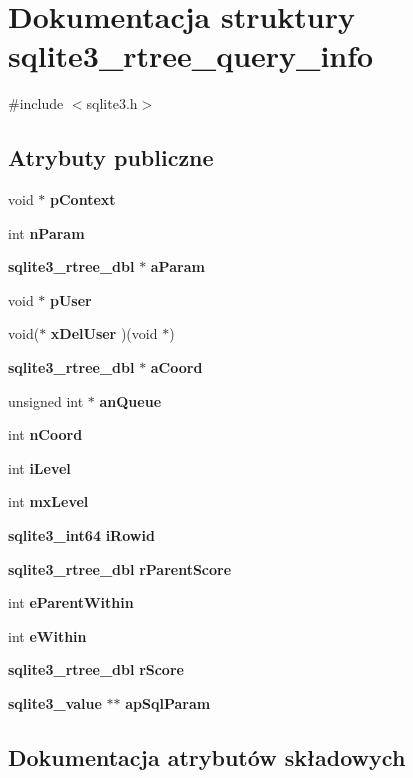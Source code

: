 \section{Dokumentacja struktury sqlite3\+\_\+rtree\+\_\+query\+\_\+info}
\label{structsqlite3__rtree__query__info}


{\ttfamily \#include $<$sqlite3.\+h$>$}

\subsection*{Atrybuty publiczne}
\begin{DoxyCompactItemize}
\item 
void $\ast$ \textbf{ p\+Context}
\item 
int \textbf{ n\+Param}
\item 
\textbf{ sqlite3\+\_\+rtree\+\_\+dbl} $\ast$ \textbf{ a\+Param}
\item 
void $\ast$ \textbf{ p\+User}
\item 
void($\ast$ \textbf{ x\+Del\+User} )(void $\ast$)
\item 
\textbf{ sqlite3\+\_\+rtree\+\_\+dbl} $\ast$ \textbf{ a\+Coord}
\item 
unsigned int $\ast$ \textbf{ an\+Queue}
\item 
int \textbf{ n\+Coord}
\item 
int \textbf{ i\+Level}
\item 
int \textbf{ mx\+Level}
\item 
\textbf{ sqlite3\+\_\+int64} \textbf{ i\+Rowid}
\item 
\textbf{ sqlite3\+\_\+rtree\+\_\+dbl} \textbf{ r\+Parent\+Score}
\item 
int \textbf{ e\+Parent\+Within}
\item 
int \textbf{ e\+Within}
\item 
\textbf{ sqlite3\+\_\+rtree\+\_\+dbl} \textbf{ r\+Score}
\item 
\textbf{ sqlite3\+\_\+value} $\ast$$\ast$ \textbf{ ap\+Sql\+Param}
\end{DoxyCompactItemize}


\subsection{Dokumentacja atrybutów składowych}
\mbox{\label{structsqlite3__rtree__query__info_a25340b0dbf1d566172da1d71a4db1427}} 
